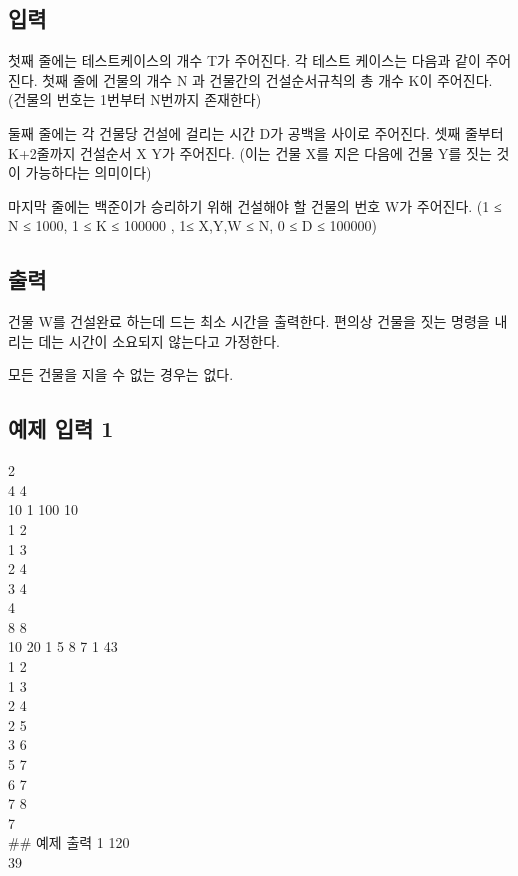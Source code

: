 \documentclass[11pt]{article}
\begin{document}
\hypertarget{uxc785uxb825}{%
\subsection{입력}\label{uxc785uxb825}}

첫째 줄에는 테스트케이스의 개수 T가 주어진다. 각 테스트 케이스는 다음과
같이 주어진다. 첫째 줄에 건물의 개수 N 과 건물간의 건설순서규칙의 총
개수 K이 주어진다. (건물의 번호는 1번부터 N번까지 존재한다)

둘째 줄에는 각 건물당 건설에 걸리는 시간 D가 공백을 사이로 주어진다.
셋째 줄부터 K+2줄까지 건설순서 X Y가 주어진다. (이는 건물 X를 지은
다음에 건물 Y를 짓는 것이 가능하다는 의미이다)

마지막 줄에는 백준이가 승리하기 위해 건설해야 할 건물의 번호 W가
주어진다. (1 ≤ N ≤ 1000, 1 ≤ K ≤ 100000 , 1≤ X,Y,W ≤ N, 0 ≤ D ≤ 100000)

\hypertarget{uxcd9cuxb825}{%
\subsection{출력}\label{uxcd9cuxb825}}

건물 W를 건설완료 하는데 드는 최소 시간을 출력한다. 편의상 건물을 짓는
명령을 내리는 데는 시간이 소요되지 않는다고 가정한다.

모든 건물을 지을 수 없는 경우는 없다.

\hypertarget{uxc608uxc81c-uxc785uxb825-1}{%
\subsection{예제 입력 1}\label{uxc608uxc81c-uxc785uxb825-1}}

2\\
4 4\\
10 1 100 10\\
1 2\\
1 3\\
2 4\\
3 4\\
4\\
8 8\\
10 20 1 5 8 7 1 43\\
1 2\\
1 3\\
2 4\\
2 5\\
3 6\\
5 7\\
6 7\\
7 8\\
7\\
\#\# 예제 출력 1 120\\
39
\end{document}

